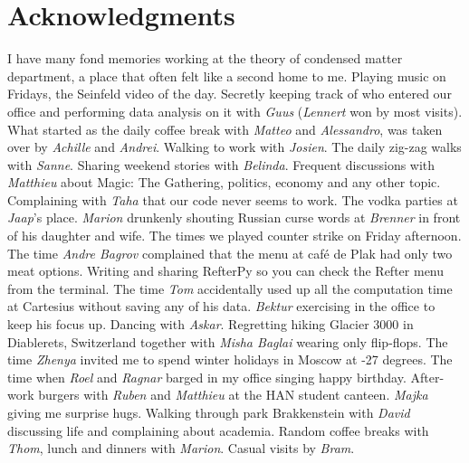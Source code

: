 \manualmark
{}%
%
%
\chapter*{Acknowledgments}%


I have many fond memories working at the theory of condensed matter department, a place that often felt like a second home to me. Playing music on Fridays, the Seinfeld video of the day. Secretly keeping track of who entered our office and performing data analysis on it with \emph{Guus} (\emph{Lennert} won by most visits). What started as the daily coffee break with \emph{Matteo} and \emph{Alessandro}, was taken over by \emph{Achille} and \emph{Andrei}. Walking to work with \emph{Josien}. The daily zig-zag walks with \emph{Sanne}. Sharing weekend stories with \emph{Belinda}. Frequent discussions with \emph{Matthieu} about Magic: The Gathering, politics, economy and any other topic. Complaining with \emph{Taha} that our code never seems to work.
The vodka parties at \emph{Jaap}'s place. \emph{Marion} drunkenly shouting Russian curse words at \emph{Brenner} in front of his daughter and wife. The times we played counter strike on Friday afternoon. The time \emph{Andre Bagrov} complained that the menu at caf\'e de Plak had only two meat options. 
Writing and sharing RefterPy so you can check the Refter menu from the terminal. The time \emph{Tom} accidentally used up all the computation time at Cartesius without saving any of his data. \emph{Bektur} exercising in the office to keep his focus up. Dancing with \emph{Askar}. Regretting hiking Glacier 3000 in Diablerets, Switzerland together with \emph{Misha Baglai} wearing only flip-flops. The time \emph{Zhenya} invited me to spend winter holidays in Moscow at -27 degrees. The time when \emph{Roel} and \emph{Ragnar} barged in my office singing happy birthday. After-work burgers with \emph{Ruben} and \emph{Matthieu} at the HAN student canteen. \emph{Majka} giving me surprise hugs. Walking through park Brakkenstein with \emph{David} discussing life and complaining about academia. Random coffee breaks with \emph{Thom}, lunch and dinners with \emph{Marion}. Casual visits by \emph{Bram}. %

